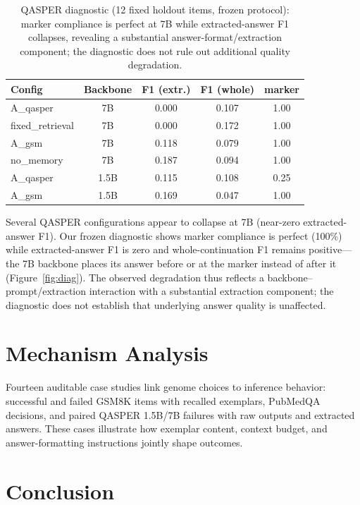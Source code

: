\documentclass[11pt]{article}
\begin{document}
\begin{table}[t]
\centering\small
\begin{tabular}{@{}lcccc@{}}
\toprule
Config & Backbone & F1 (extr.) & F1 (whole) & marker \\
\midrule
A\_qasper & 7B & 0.000 & 0.107 & 1.00 \\
fixed\_retrieval & 7B & 0.000 & 0.172 & 1.00 \\
A\_gsm & 7B & 0.118 & 0.079 & 1.00 \\
no\_memory & 7B & 0.187 & 0.094 & 1.00 \\
\midrule
A\_qasper & 1.5B & 0.115 & 0.108 & 0.25 \\
A\_gsm & 1.5B & 0.169 & 0.047 & 1.00 \\
\bottomrule
\end{tabular}
\caption{QASPER diagnostic (12 fixed holdout items, frozen protocol):
marker compliance is perfect at 7B while extracted-answer F1 collapses,
revealing a substantial answer-format/extraction component; the diagnostic
does not rule out additional quality degradation.}
\label{tab:diag}
\end{table}

Several QASPER configurations appear to collapse at 7B (near-zero
extracted-answer F1). Our frozen diagnostic shows marker compliance is
perfect (100\%) while extracted-answer F1 is zero and whole-continuation F1
remains positive---the 7B backbone places its answer before or at the marker
instead of after it (Figure~\ref{fig:diag}). The observed degradation thus
reflects a backbone--prompt/extraction interaction with a substantial
extraction component; the diagnostic does not establish that underlying
answer quality is unaffected.

\section{Mechanism Analysis}

Fourteen auditable case studies link genome choices to inference behavior:
successful and failed GSM8K items with recalled exemplars, PubMedQA
decisions, and paired QASPER 1.5B/7B failures with raw outputs and extracted
answers. These cases illustrate how exemplar content, context budget, and
answer-formatting instructions jointly shape outcomes.

\section{Conclusion}
\end{document}
